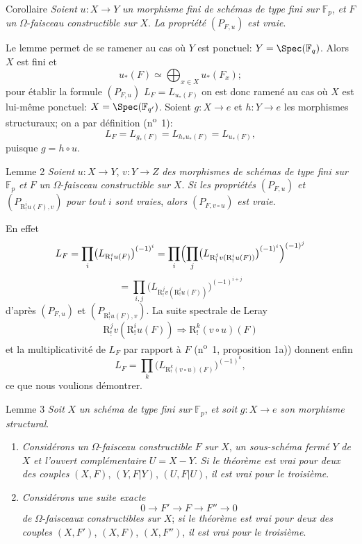 \begin{statement}{Corollaire}
\emph{Soient} $u:X\to Y$ \emph{un morphisme fini de schémas de type fini sur} $\mathbb{F}_p$, \emph{et} $F$ \emph{un} $\Omega$-\emph{faisceau constructible sur} $X$. \emph{La propriété} $(P_{F,u})$ \emph{est vraie}.
\end{statement}

Le lemme permet de se ramener au cas où $Y$ est ponctuel: $Y=\Spec(\mathbb{F}_q)$. Alors $X$ est fini et
\[
u_*(F)\simeq \bigoplus_{x\in X}u_*(F_x);
\]
pour établir la formule $(P_{F,u})$ $L_F=L_{u_*(F)}$ on est donc ramené au cas où $X$ est lui-même ponctuel: $X=\Spec(\mathbb{F}_{q'})$. Soient $g:X\to e$ et $h:Y\to e$ les morphismes structuraux; on a par définition (n\textsuperscript{o}~1):
\[
L_F=L_{g_*(F)}=L_{h_*u_*(F)}=L_{u_*(F)},
\]
puisque $g=h\circ u$.

\begin{statement}{Lemme 2}
\emph{Soient} $u:X\to Y$, $v:Y\to Z$ \emph{des morphismes de schémas de type fini sur} $\mathbb{F}_p$ \emph{et} $F$ \emph{un} $\Omega$-\emph{faisceau constructible sur} $X$. \emph{Si les propriétés} $(P_{F,u})$ \emph{et} $(P_{\mathrm{R}^i_!u(F),v})$ \emph{pour tout} $i$ \emph{sont vraies}, \emph{alors} $(P_{F,v\circ u})$ \emph{est vraie}.
\end{statement}

En effet
\[
L_F=\prod_i\bigl(L_{\mathrm{R}^i_!u(F)}\bigr)^{(-1)^i}
 =\prod_i\Bigl(\prod_j\bigl(L_{\mathrm{R}^j_!v(\mathrm{R}^i_!u(F))}\bigr)^{(-1)^i}\Bigr)^{(-1)^j}
\]
\[
=\prod_{i,j}\bigl(L_{\mathrm{R}^j_!v(\mathrm{R}^i_!u(F))}\bigr)^{(-1)^{i+j}}
\]
d'après $(P_{F,u})$ et $(P_{\mathrm{R}^i_!u(F),v})$. La suite spectrale de Leray
\[
\mathrm{R}^j_!v(\mathrm{R}^i_!u(F))\Longrightarrow \mathrm{R}^k_!(v\circ u)(F)
\]
et la multiplicativité de $L_F$ par
rapport à $F$ (n\textsuperscript{o}~1, proposition 1a)) donnent enfin
\[
L_F=\prod_k\bigl(L_{\mathrm{R}^k_!(v\circ u)(F)}\bigr)^{(-1)^k},
\]
ce que nous voulions démontrer.

\begin{statement}{Lemme 3}
\emph{Soit} $X$ \emph{un schéma de type fini sur} $\mathbb{F}_p$, \emph{et soit} $g:X\to e$ \emph{son morphisme structural}.
\begin{enumerate}[label=\alph*)]
\item \emph{Considérons un} $\Omega$-\emph{faisceau constructible} $F$ \emph{sur} $X$, \emph{un sous-schéma fermé} $Y$ \emph{de} $X$ \emph{et l'ouvert complémentaire} $U=X-Y$. \emph{Si le théorème est vrai pour deux des couples} $(X,F)$, $(Y,F|Y)$, $(U,F|U)$, \emph{il est vrai pour le troisième}.
\item \emph{Considérons une suite exacte}
\[
0\longrightarrow F'\longrightarrow F\longrightarrow F''\longrightarrow0
\]
\emph{de} $\Omega$-\emph{faisceaux constructibles sur} $X$; \emph{si le théorème est vrai pour deux des couples} $(X,F')$, $(X,F)$, $(X,F'')$, \emph{il est vrai pour le troisième}.
\end{enumerate}
\end{statement}

